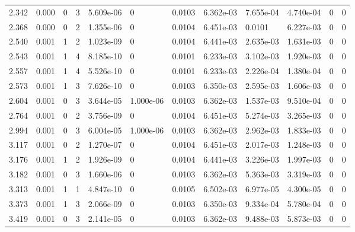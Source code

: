 \documentclass[preview]{standalone}
\begin{document}
{{\begin{tabular}{L{1.2cm}C{1.2cm} C{0.3cm}C{0.5cm} C{1.4cm}C{1.4cm} C{1.4cm}C{1.4cm} C{1.6cm}C{1.6cm} C{1.6cm}C{1.6cm}}
  2.342  &  0.000  & 0     &  3 &  5.609e-06  & 0  &  0.0103&   6.362e-03& 7.655e-04 & 4.740e-04   &  0 & 0  \\ 
  2.368  &  0.000  & 0     &  2 &  1.355e-06  & 0  &  0.0104&   6.451e-03& 0.0101 & 6.227e-03   &  0 & 0  \\ 
  2.540  &  0.001  & 1     &  2 &  1.023e-09  & 0  &  0.0104&   6.441e-03& 2.635e-03 & 1.631e-03   &  0 & 0  \\ 
  2.543  &  0.001  & 1     &  4 &  8.185e-10  & 0  &  0.0101&   6.233e-03& 3.102e-03 & 1.920e-03   &  0 & 0  \\ 
  2.557  &  0.001  & 1     &  4 &  5.526e-10  & 0  &  0.0101&   6.233e-03& 2.226e-04 & 1.380e-04   &  0 & 0  \\ 
  2.573  &  0.001  & 1     &  3 &  7.626e-10  & 0  &  0.0103&   6.350e-03& 2.595e-03 & 1.606e-03   &  0 & 0  \\ 
  2.604  &  0.001  & 0     &  3 &  3.644e-05  & 1.000e-06  &  0.0103&   6.362e-03& 1.537e-03 & 9.510e-04   &  0 & 0  \\ 
  2.764  &  0.001  & 0     &  2 &  3.756e-09  & 0  &  0.0104&   6.451e-03& 5.274e-03 & 3.265e-03   &  0 & 0  \\ 
  2.994  &  0.001  & 0     &  3 &  6.004e-05  & 1.000e-06  &  0.0103&   6.362e-03& 2.962e-03 & 1.833e-03   &  0 & 0  \\ 
  3.117  &  0.001  & 0     &  2 &  1.270e-07  & 0  &  0.0104&   6.451e-03& 2.017e-03 & 1.248e-03   &  0 & 0  \\ 
  3.176  &  0.001  & 1     &  2 &  1.926e-09  & 0  &  0.0104&   6.441e-03& 3.226e-03 & 1.997e-03   &  0 & 0  \\ 
  3.182  &  0.001  & 0     &  3 &  1.660e-06  & 0  &  0.0103&   6.362e-03& 5.363e-03 & 3.319e-03   &  0 & 0  \\ 
  3.313  &  0.001  & 1     &  1 &  4.847e-10  & 0  &  0.0105&   6.502e-03& 6.977e-05 & 4.300e-05   &  0 & 0  \\ 
  3.373  &  0.001  & 1     &  3 &  2.066e-09  & 0  &  0.0103&   6.350e-03& 9.334e-04 & 5.780e-04   &  0 & 0  \\ 
  3.419  &  0.001  & 0     &  3 &  2.141e-05  & 0  &  0.0103&   6.362e-03& 9.488e-03 & 5.873e-03   &  0 & 0  \\ 
\hline 
\end{tabular} 

}}
\end{document}
